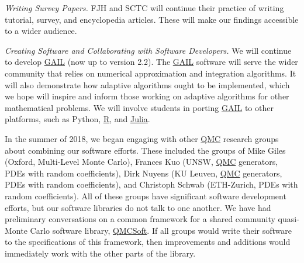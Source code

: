 \documentclass[11pt]{NSFamsart}
\newcommand{\QMCSoft}{\hyperlink{QMCSoftlink}{QMCSoft}\xspace}
\newcommand{\GAIL}{\hyperlink{GAILlink}{GAIL}\xspace}
\newcommand{\QMC}{\hyperlink{QMClink}{QMC}\xspace}
\newcommand{\Rlang}{\hyperlink{Rlink}{R}\xspace}
\newcommand{\Julia}{\hyperlink{Julialink}{Julia}\xspace}
\begin{document}
\emph{Writing Survey Papers.}
FJH and SCTC will continue their practice of writing tutorial, survey, and encyclopedia articles.  These will make our findings accessible to a wider audience.

\emph{Creating Software and Collaborating with Software Developers.}
We will continue to develop \GAIL \citep{ChoEtal17b} (now up to version 2.2).  The \GAIL software 
will serve the wider community that relies on numerical approximation and integration algorithms.  It will 
also demonstrate how adaptive algorithms ought to be implemented, which we hope will inspire and 
inform those working on adaptive algorithms for other mathematical problems.  We will involve 
students in porting \GAIL to other platforms, such as Python, \Rlang, and \Julia.  

In the summer of 2018, we began engaging with other \QMC research groups about combining our software efforts.  These included the groups of Mike Giles (Oxford, Multi-Level Monte Carlo),  Frances Kuo (UNSW, \QMC generators, PDEs with random coefficients),  Dirk Nuyens (KU Leuven, \QMC generators, PDEs with random coefficients), and Christoph Schwab (ETH-Zurich, PDEs with random coefficients).  All of these groups have significant software development efforts, but our software libraries do not talk to one another.  We have had preliminary conversations on a common framework for a shared community quasi-Monte Carlo software library, \QMCSoft.  If all groups would write their software to the specifications of this framework, then improvements and additions would immediately work with the other parts of the library.
\end{document}
